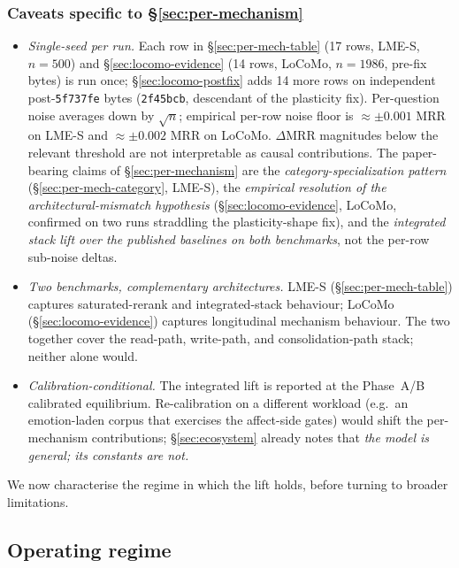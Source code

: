 \documentclass[11pt]{article}
\begin{document}
\subsubsection{Caveats specific to \S\ref{sec:per-mechanism}}

\begin{itemize}
\item \emph{Single-seed per run.}  Each row in
  \S\ref{sec:per-mech-table} (17 rows, LME-S, $n = 500$) and
  \S\ref{sec:locomo-evidence} (14 rows, LoCoMo, $n = 1986$, pre-fix
  bytes) is run once; \S\ref{sec:locomo-postfix} adds 14 more rows
  on independent post-\texttt{5f737fe} bytes (\texttt{2f45bcb},
  descendant of the plasticity fix).  Per-question noise averages
  down by $\sqrt{n}$; empirical per-row noise floor is $\approx
  \pm 0.001$ MRR on LME-S and $\approx \pm 0.002$ MRR on LoCoMo.
  $\Delta$MRR magnitudes below the relevant threshold are not
  interpretable as causal contributions.  The paper-bearing claims
  of \S\ref{sec:per-mechanism} are the
  \emph{category-specialization pattern}
  (\S\ref{sec:per-mech-category}, LME-S), the \emph{empirical
  resolution of the architectural-mismatch hypothesis}
  (\S\ref{sec:locomo-evidence}, LoCoMo, confirmed on two runs
  straddling the plasticity-shape fix), and the \emph{integrated
  stack lift over the published baselines on both benchmarks}, not
  the per-row sub-noise deltas.
\item \emph{Two benchmarks, complementary architectures.}  LME-S
  (\S\ref{sec:per-mech-table}) captures saturated-rerank and
  integrated-stack behaviour; LoCoMo (\S\ref{sec:locomo-evidence})
  captures longitudinal mechanism behaviour.  The two together cover
  the read-path, write-path, and consolidation-path stack; neither
  alone would.
\item \emph{Calibration-conditional.}  The integrated lift is
  reported at the Phase~A/B calibrated equilibrium.  Re-calibration
  on a different workload (e.g.\ an emotion-laden corpus that
  exercises the affect-side gates) would shift the per-mechanism
  contributions; \S\ref{sec:ecosystem} already notes that
  \emph{the model is general; its constants are not.}
\end{itemize}

\medskip
\noindent We now characterise the regime in which the lift holds,
before turning to broader limitations.

\subsection{Operating regime}
\label{sec:regime}
\end{document}
